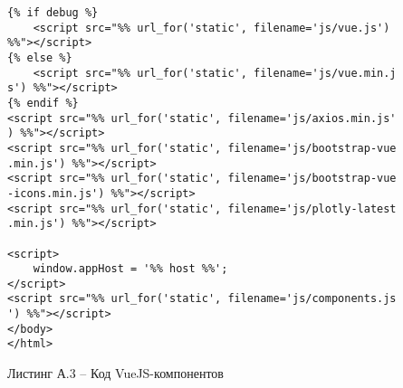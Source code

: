 \begin{verbatim}
{% if debug %}
    <script src="%% url_for('static', filename='js/vue.js') 
%%"></script>
{% else %}
    <script src="%% url_for('static', filename='js/vue.min.j
s') %%"></script>
{% endif %}
<script src="%% url_for('static', filename='js/axios.min.js'
) %%"></script>
<script src="%% url_for('static', filename='js/bootstrap-vue
.min.js') %%"></script>
<script src="%% url_for('static', filename='js/bootstrap-vue
-icons.min.js') %%"></script>
<script src="%% url_for('static', filename='js/plotly-latest
.min.js') %%"></script>

<script>
    window.appHost = '%% host %%';
</script>
<script src="%% url_for('static', filename='js/components.js
') %%"></script>
</body>
</html>
\end{verbatim}
\vspace{8mm}
\Large
\par
Листинг А.3 -- Код VueJS-компонентов
\vspace{8mm}
\large

